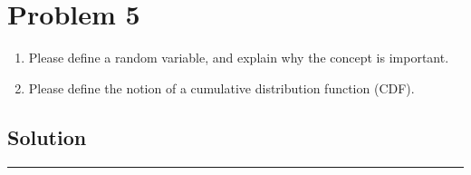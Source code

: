 \section{Problem 5}
\begin{enumerate}[5a.]
	\item Please define a random variable, and explain why the concept is important.
	\item Please define the notion of a cumulative distribution function (CDF).
\end{enumerate}

\subsection{Solution}

\noindent\rule{\textwidth}{1pt}